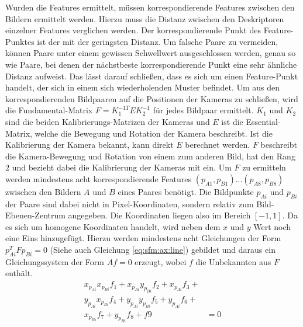 \documentclass[12pt,titlepage, twoside]{article}
\begin{document}
Wurden die Features ermittelt, müssen korrespondierende Features zwischen den Bildern ermittelt werden. 
Hierzu muss die Distanz zwischen den Deskriptoren einzelner Features verglichen werden. 
Der korrespondierende Punkt des Feature-Punktes ist der mit der geringsten Distanz. 
Um falsche Paare zu vermeiden, können Paare unter einem gewissen Schwellwert ausgeschlossen werden, genau so wie 
Paare, bei denen der nächstbeste korrespondierende Punkt eine sehr ähnliche Distanz aufweist. 
Das lässt darauf schließen, dass es sich um einen Feature-Punkt handelt, der sich in einem sich wiederholenden Muster befindet.
Um aus den korrespondierenden Bildpaaren auf die Positionen der Kameras zu schließen, wird die Fundamental-Matrix $F=K_1^{-1T}EK_2^{-1}$ für jedes Bildpaar ermittelt. 
$K_1$ und $K_2$ sind die beiden Kalibrierungs-Matrizen der Kameras und $E$ ist die Essential-Matrix, welche die Bewegung und Rotation der Kamera beschreibt.
Ist die Kalibrierung der Kamera bekannt, kann direkt $E$ berechnet werden.
$F$ beschreibt die Kamera-Bewegung und Rotation von einem zum anderen Bild, hat den Rang $2$ und bezieht dabei die Kalibrierung der Kameras mit ein.
Um $F$ zu ermitteln werden mindestens acht korrespondierende Features $(p_{A1},p_{B1})...(p_{A8},p_{B8})$ zwischen den Bildern $A$ und $B$ eines Paares benötigt. 
Die Bildpunkte $p_{Ai}$ und $p_{Bi}$ der Paare sind dabei nicht in Pixel-Koordinaten, sondern relativ zum Bild-Ebenen-Zentrum angegeben. 
Die Koordinaten liegen also im Bereich  $[-1, 1]$.
Da es sich um homogene Koordinaten handelt, wird neben dem $x$ und $y$ Wert noch eine Eins hinzugefügt.
Hierzu werden mindestens acht Gleichungen der Form $p_{Ai}^TFp_{Bi}=0$ (Siehe auch Gleichung \ref{eq:sfm:ax:line}) gebildet und daraus ein Gleichungssystem der Form $Af=0$ erzeugt, wobei $f$ die Unbekannten aus $F$ enthält.
\begin{equation}
    \label{eq:sfm:ax:line}
    \begin{aligned}
    x_{p_{Ai}}x_{p_{Bi}}f_1 + x_{p_{Ai}}y_{p_{Bi}}f_2 + x_{p_{Ai}}f_3 + &\\
    y_{p_{Ai}}x_{p_{Bi}}f_4 + y_{p_{Ai}}y_{p_{Bi}}f_5 + y_{p_{Ai}}f_6 + &\\
    x_{p_{Bi}}f_7 + y_{p_{Bi}}f_8 + f9 &= 0
    \end{aligned}
\end{equation}
\end{document}
